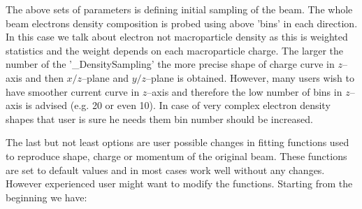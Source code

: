 \documentclass[12pt]{article}
\begin{document}
\begin{itemize}
The above sets of parameters is defining initial sampling of the beam. The whole beam electrons density composition is probed using above 'bins' in each direction. In this case we talk about electron not macroparticle density as this is weighted statistics and the weight depends on each macroparticle charge. The larger the number of the '\_DensitySampling' the more precise shape of charge curve in $z$--axis and then $x/z$--plane and $y/z$--plane is obtained. However, many users wish to have smoother current curve in $z$--axis and therefore the low number of bins in $z$--axis is advised (e.g. 20 or even 10). In case of very complex electron density shapes that user is sure he needs them bin number should be increased.

\end{itemize}

The last but not least options are user possible changes in fitting functions used to reproduce shape, charge or momentum of the original beam. These functions are set to default values and in most cases work well without any changes. However experienced user might want to modify the functions. Starting from the beginning we have:
\end{document}
